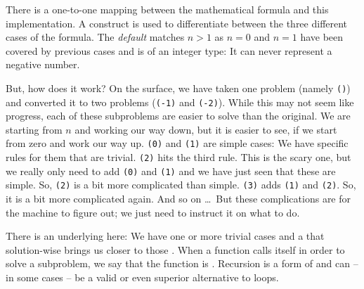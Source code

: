 \inputminted[]{csharp}{../src/csharp/functions/fib/Program.cs}

There is a one-to-one mapping between the mathematical formula and this implementation. A  construct is used to differentiate between the three different cases of the formula. The \textsl{default} matches $n>1$ as $n=0$ and $n=1$ have been covered by previous cases and  is of an  integer type: It can never represent a negative number.

But, how does it work? On the surface, we have taken one problem (namely \texttt{()}) and converted it to two problems (\texttt{(-1)} and \texttt{(-2)}). While this may not seem like progress, each of these subproblems are easier to solve than the original. We are starting from $n$ and working our way down, but it is easier to see, if we start from zero and work our way up. \texttt{(0)} and \texttt{(1)} are simple cases: We have specific rules for them that are trivial. \texttt{(2)} hits the third rule. This is the scary one, but we really only need to add \texttt{(0)} and \texttt{(1)} and we have just seen that these are simple. So, \texttt{(2)} is a bit more complicated than simple. \texttt{(3)} adds \texttt{(1)} and \texttt{(2)}. So, it is a bit more complicated again. And so on \ldots\ But these complications are for the machine to figure out; we just need to instruct it on what to do.

There is an underlying  here: We have one or more trivial cases and a  that solution-wise brings us closer to those . When a function calls itself in order to solve a subproblem, we say that the function is . Recursion is a form of  and can -- in some cases -- be a valid or even superior alternative to loops.

